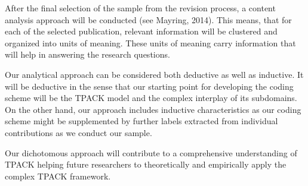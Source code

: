 \documentclass[
]{article}
\begin{document}
After the final selection of the sample from the revision process, a
content analysis approach will be conducted (see Mayring, 2014). This
means, that for each of the selected publication, relevant information
will be clustered and organized into units of meaning. These units of
meaning carry information that will help in answering the research
questions.

Our analytical approach can be considered both deductive as well as
inductive. It will be deductive in the sense that our starting point for
developing the coding scheme will be the TPACK model and the complex
interplay of its subdomains. On the other hand, our approach includes
inductive characteristics as our coding scheme might be supplemented by
further labels extracted from individual contributions as we conduct our
sample.

Our dichotomous approach will contribute to a comprehensive
understanding of TPACK helping future researchers to theoretically and
empirically apply the complex TPACK framework.
\end{document}
